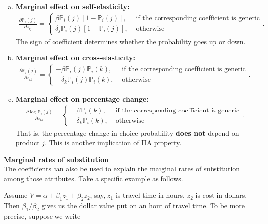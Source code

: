 \documentclass[11pt]{article}
\newcommand{\prob}{\ensuremath{\mathbb{P}}}
\newenvironment{example}[2][Example]{\begin{trivlist}
\item[\hskip \labelsep {\bfseries #1}\hskip \labelsep {\bfseries #2.}]}{\end{trivlist}}
\begin{document}
\begin{enumerate}[I.]
\begin{enumerate}[1.]
\begin{enumerate}[(a)]
\item \textbf{Marginal effect on self-elasticity:} 
\begin{align*}
\frac{\partial \prob_i(j)}{\partial z_{ij}} = \left\{ \begin{array}{ll}
        \beta\prob_i(j)[1-\prob_i(j)], & \text{ if the corresponding coefficient is generic}\\
        \delta_j\prob_i(j)[1-\prob_i(j)], & \text{ otherwise}
         \end{array} \right..
\end{align*}
The sign of coefficient determines whether the probability goes up or down. 
\item \textbf{Marginal effect on cross-elasticity:}
\begin{align*}
\frac{\partial \prob_i(j)}{\partial z_{ik}} = \left\{ \begin{array}{ll}
        -\beta\prob_i(j)\prob_i(k), & \text{ if the corresponding coefficient is generic}\\
        -\delta_k\prob_i(j)\prob_i(k), & \text{ otherwise}
         \end{array} \right..
\end{align*}
\item \textbf{Marginal effect on percentage change:}\\
\begin{align*}
\frac{\partial \log \prob_i(j)}{\partial z_{ik}} = \left\{ \begin{array}{ll}
        -\beta\prob_i(k), & \text{ if the corresponding coefficient is generic}\\
        -\delta_k\prob_i(k), & \text{ otherwise}
         \end{array} \right..
\end{align*}
That is, the percentage change in choice probability \textbf{does not} depend on product $j$. This is another implication of IIA property.
\end{enumerate}
\end{enumerate}
\item \textbf{Marginal rates of substitution}
\vspace{0.3em}\\
\text{\quad} The coefficients can also be used to explain the marginal rates of substitution among those attributes. Take a specific example as follows.
\begin{example}2
Assume $V = \alpha + \beta_1z_1 + \beta_2z_2$, say, $z_1$ is travel time in hours, $z_2$ is cost in dollars. Then $\beta_1/\beta_2$ gives us the dollar value put on an hour of travel time. To be more precise, suppose we write 

\end{example}
\end{enumerate}
\end{document}
